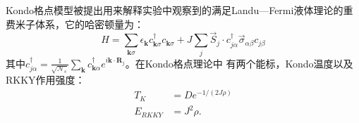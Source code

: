 \documentclass[10pt,openany]{book}
\theoremstyle{thmstyle} %
\theoremstyle{defstyle} %
\theoremstyle{prostyle} %
\begin{document}
Kondo格点模型被提出用来解释实验中观察到的满足Landu—Fermi液体理论的重费米子体系，它的哈密顿量为：
\begin{equation}
	H=\sum_{\mathbf{k} \sigma} \epsilon_{\mathbf{k}} c_{\mathbf{k} \sigma}^{\dagger} c_{\mathbf{k} \sigma}+J \sum_j \vec{S}_j \cdot c_{j \alpha}^{\dagger} \vec{\sigma}_{\alpha \beta} c_{j \beta}
\end{equation}
其中$ c_{j \alpha}^{\dagger}=\frac{1}{\sqrt{\mathcal{N}_s}} \sum_{\mathbf{k}} c_{\mathbf{k} \alpha}^{\dagger} e^{i \mathbf{k} \cdot \mathbf{R}_j} $。在Kondo格点理论中
有两个能标，Kondo温度以及RKKY作用强度：
\begin{equation}
	\begin{aligned}
		T_K & =D e^{-1 /(2 J \rho)} \\
		E_{R K K Y} & =J^2 \rho .
		\end{aligned}
\end{equation} 
\end{document}
